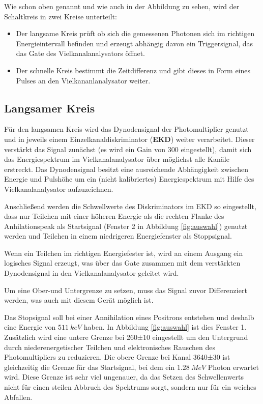 \documentclass[a4paper,12pt]{article}
\begin{document}
Wie schon oben genannt und wie auch in der Abbildung zu sehen, wird der Schaltkreis in zwei Kreise unterteilt:
\begin{itemize}
	\item
	Der langsame Kreis prüft ob sich die gemessenen Photonen sich im richtigen Energieintervall 
	befinden und erzeugt abhängig davon ein Triggersignal, das das Gate des Vielkanalanalysators öffnet.
	\item
		Der schnelle Kreis bestimmt die Zeitdifferenz und gibt dieses in Form eines Pulses an den
	Vielkananlanalysator weiter.
\end{itemize}
\subsection*{Langsamer Kreis}
Für den langsamen Kreis wird das Dynodensignal der Photomultiplier genutzt und in jeweils einem
Einzelkanaldiskriminator (\textbf{EKD}) weiter verarbeitet.
Dieser verstärkt das Signal zunächst (es wird ein Gain von 300 eingestellt),
damit sich das Energiespektrum im Vielkanalanalysator über möglichst alle Kanäle erstreckt.
Das Dynodensignal besitzt eine ausreichende Abhängigkeit zwischen Energie und Pulshöhe
um ein (nicht kalibriertes) Energiespektrum mit Hilfe des Vielkanalanalysator aufzuzeichnen.

Anschließend werden die Schwellwerte des Diskriminators im EKD so eingestellt,
dass nur Teilchen mit einer höheren Energie als die rechten Flanke des Anhilationspeak als
Startsignal (Fenster 2 in Abbildung \ref{fig:auswahl}) genutzt werden
und Teilchen in einem niedrigeren Energiefenster als Stoppsignal.

Wenn ein Teilchen im richtigen Energiefester ist, wird an einem Ausgang ein logisches Signal erzeugt,
was über das Gate zusammen mit dem verstärkten Dynodensignal in den Vielkanalanalysator geleitet wird.

Um eine Ober-und Untergrenze zu setzen, muss das Signal zuvor Differenziert werden,
was auch mit diesem Gerät möglich ist\cite{linearAmplifier}.

Das Stopsignal soll bei einer Annihilation eines Positrons entstehen
und deshalb eine Energie von $\SI{511}{keV}$ haben.
In Abbildung \ref{fig:auswahl} ist dies Fenster 1.
Zusätzlich wird eine untere Grenze bei 260±10
eingestellt um den Untergrund durch niederenergetischer Teilchen und elektronisches Rauschen des Photomultipliers zu reduzieren.
Die obere Grenze bei Kanal 3640±30 ist gleichzeitig die Grenze für das Startsignal,
bei dem ein $\SI{1.28}{MeV}$ Photon erwartet wird.
Diese Grenze ist sehr viel ungenauer,
da das Setzen des Schwellenwerts nicht für einen steilen Abbruch des Spektrums sorgt, sondern nur für ein weiches Abfallen.
\end{document}
